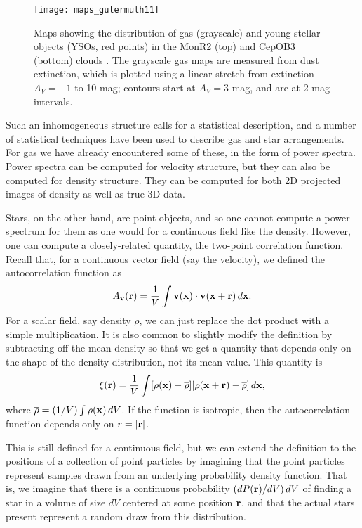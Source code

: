 \begin{figure}
\texttt{[image: maps\_gutermuth11]}
\caption[Maps of gas and young stars in two clouds]{
\label{fig:maps_gutermuth11}
Maps showing the distribution of gas (grayscale) and young stellar objects (YSOs, red points) in the MonR2 (top) and CepOB3 (bottom) clouds \citep{gutermuth11a}. The grayscale gas maps are measured from dust extinction, which is plotted using a linear stretch from extinction $A_V = -1$ to 10 mag; contours start at $A_V=3$ mag, and are at 2 mag intervals.
}
\end{figure}

Such an inhomogeneous structure calls for a statistical description, and a number of statistical techniques have been used to describe gas and star arrangements. For gas we have already encountered some of these, in the form of power spectra. Power spectra can be computed for velocity structure, but they can also be computed for density structure. They can be computed for both 2D projected images of density as well as true 3D data.

Stars, on the other hand, are point objects, and so one cannot compute a power spectrum for them as one would for a continuous field like the density. However, one can compute a closely-related quantity, the two-point correlation function. Recall that, for a continuous vector field (say the velocity), we defined the autocorrelation function as
\begin{equation}
A_{\mathbf{v}}(\mathbf{r}) = \frac{1}{V} \int \mathbf{v}(\mathbf{x}) \cdot \mathbf{v}(\mathbf{x} + \mathbf{r})\, d\mathbf{x}.
\end{equation}
For a scalar field, say density $\rho$, we can just replace the dot product with a simple multiplication. It is also common to slightly modify the definition by subtracting off the mean density so that we get a quantity that depends only on the shape of the density distribution, not its mean value. This quantity is
\begin{equation}
\label{eq:autocorr}
\xi(\vecr) = \frac{1}{V} \int [\rho(\vecx)-\overline{\rho}] [\rho(\vecx + \vecr)-\overline{\rho}]\, d\vecx,
\end{equation}
where $\overline{\rho} = (1/V) \int \rho(\mathbf{x})\, dV$. If the function is isotropic, then the autocorrelation function depends only on $r=|\mathbf{r}|$.

This is still defined for a continuous field, but we can extend the definition to the positions of a collection of point particles by imagining that the point particles represent samples drawn from an underlying probability density function. That is, we imagine that there is a continuous probability $(dP(\mathbf{r})/dV)\, dV$ of finding a star in a volume of size $dV$ centered at some position $\mathbf{r}$, and that the actual stars present represent a random draw from this distribution.

